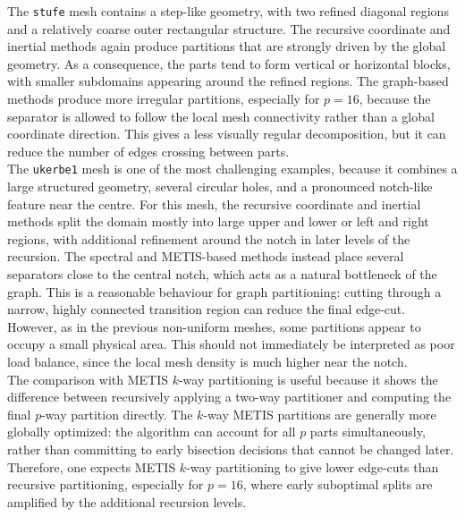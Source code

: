 \documentclass[unicode,10pt,a4paper,oneside,numbers=endperiod,openany]{scrartcl}
\begin{document}
The \texttt{stufe} mesh contains a step-like geometry, with two refined diagonal regions and
a relatively coarse outer rectangular structure. The recursive coordinate and inertial methods
again produce partitions that are strongly driven by the global geometry. As a consequence,
the parts tend to form vertical or horizontal blocks, with smaller subdomains appearing around
the refined regions. The graph-based methods produce more irregular partitions, especially for
\(p=16\), because the separator is allowed to follow the local mesh connectivity rather than a
global coordinate direction. This gives a less visually regular decomposition, but it can reduce
the number of edges crossing between parts.\\

The \texttt{ukerbe1} mesh is one of the most challenging examples, because it combines a large
structured geometry, several circular holes, and a pronounced notch-like feature near the centre.
For this mesh, the recursive coordinate and inertial methods split the domain mostly into large
upper and lower or left and right regions, with additional refinement around the notch in later
levels of the recursion. The spectral and METIS-based methods instead place several separators
close to the central notch, which acts as a natural bottleneck of the graph. This is a reasonable
behaviour for graph partitioning: cutting through a narrow, highly connected transition region can
reduce the final edge-cut. However, as in the previous non-uniform meshes, some partitions appear
to occupy a small physical area. This should not immediately be interpreted as poor load balance,
since the local mesh density is much higher near the notch.\\

The comparison with METIS \(k\)-way partitioning is useful because it shows the difference between
recursively applying a two-way partitioner and computing the final \(p\)-way partition directly.
The \(k\)-way METIS partitions are generally more globally optimized: the algorithm can account for
all \(p\) parts simultaneously, rather than committing to early bisection decisions that cannot be
changed later. Therefore, one expects METIS \(k\)-way partitioning to give lower edge-cuts than
recursive partitioning, especially for \(p=16\), where early suboptimal splits are amplified by the
additional recursion levels.
\end{document}

